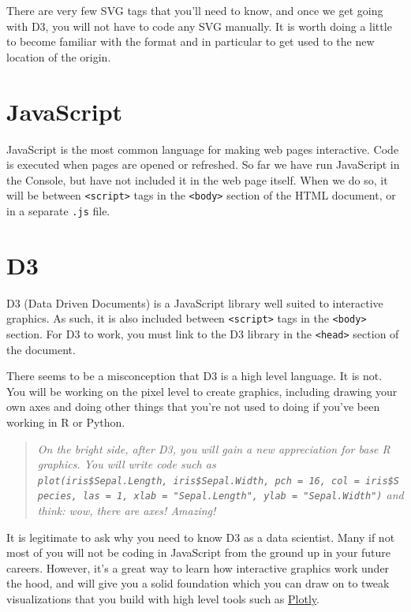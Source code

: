\documentclass[openany]{book}
\begin{document}
There are very few SVG tags that you'll need to know, and once we get going with D3, you will not have to code any SVG manually. It is worth doing a little to become familiar with the format and in particular to get used to the new location of the origin.

\hypertarget{javascript}{%
\section{JavaScript }\label{javascript}}

JavaScript is the most common language for making web pages interactive. Code is executed when pages are opened or refreshed. So far we have run JavaScript in the Console, but have not included it in the web page itself. When we do so, it will be between \texttt{\textless{}script\textgreater{}} tags in the \texttt{\textless{}body\textgreater{}} section of the HTML document, or in a separate \texttt{.js} file.

\hypertarget{d3}{%
\section{D3 }\label{d3}}

D3 (Data Driven Documents) is a JavaScript library well suited to interactive graphics. As such, it is also included between \texttt{\textless{}script\textgreater{}} tags in the \texttt{\textless{}body\textgreater{}} section. For D3 to work, you must link to the D3 library in the \texttt{\textless{}head\textgreater{}} section of the document.

There seems to be a misconception that D3 is a high level language. It is not. You will be working on the pixel level to create graphics, including drawing your own axes and doing other things that you're not used to doing if you've been working in R or Python.

\begin{quote}
 \emph{On the bright side, after D3, you will gain a new appreciation for base R graphics. You will write code such as \texttt{plot(iris\$Sepal.Length,\ iris\$Sepal.Width,\ pch\ =\ 16,\ col\ =\ iris\$Species,\ las\ =\ 1,\ xlab\ =\ "Sepal.Length",\ ylab\ =\ "Sepal.Width")} and think: wow, there are axes! Amazing!}
\end{quote}

It is legitimate to ask why you need to know D3 as a data scientist. Many if not most of you will not be coding in JavaScript from the ground up in your future careers. However, it's a great way to learn how interactive graphics work under the hood, and will give you a solid foundation which you can draw on to tweak visualizations that you build with high level tools such as \href{https://plot.ly/}{Plotly}.
\end{document}
